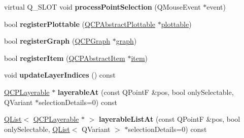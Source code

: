 \begin{DoxyCompactItemize}
\item 
virtual Q\+\_\+\+S\+L\+OT void {\bfseries process\+Point\+Selection} (Q\+Mouse\+Event $\ast$event)\hypertarget{class_q_custom_plot_ac13c10fff6613e3e80e13c787b010838}{}\label{class_q_custom_plot_ac13c10fff6613e3e80e13c787b010838}

\item 
bool {\bfseries register\+Plottable} (\hyperlink{class_q_c_p_abstract_plottable}{Q\+C\+P\+Abstract\+Plottable} $\ast$\hyperlink{class_q_custom_plot_a32de81ff53e263e785b83b52ecd99d6f}{plottable})\hypertarget{class_q_custom_plot_aeba7733bb9fadfb5a375b3f40de9e58a}{}\label{class_q_custom_plot_aeba7733bb9fadfb5a375b3f40de9e58a}

\item 
bool {\bfseries register\+Graph} (\hyperlink{class_q_c_p_graph}{Q\+C\+P\+Graph} $\ast$\hyperlink{class_q_custom_plot_a6d3ed93c2bf46ab7fa670d66be4cddaf}{graph})\hypertarget{class_q_custom_plot_acfc01230bddaea4f1782e4aa7d130af6}{}\label{class_q_custom_plot_acfc01230bddaea4f1782e4aa7d130af6}

\item 
bool {\bfseries register\+Item} (\hyperlink{class_q_c_p_abstract_item}{Q\+C\+P\+Abstract\+Item} $\ast$\hyperlink{class_q_custom_plot_a3e842b5a65b1d17fbb96cfb1fa1314d1}{item})\hypertarget{class_q_custom_plot_afbd4010b2e3f364c8d512691b2a1640a}{}\label{class_q_custom_plot_afbd4010b2e3f364c8d512691b2a1640a}

\item 
void {\bfseries update\+Layer\+Indices} () const \hypertarget{class_q_custom_plot_a3117754df3a5638787a6223c7147970f}{}\label{class_q_custom_plot_a3117754df3a5638787a6223c7147970f}

\item 
\hyperlink{class_q_c_p_layerable}{Q\+C\+P\+Layerable} $\ast$ {\bfseries layerable\+At} (const Q\+PointF \&pos, bool only\+Selectable, Q\+Variant $\ast$selection\+Details=0) const \hypertarget{class_q_custom_plot_a3fffd1d8364f657482ae985e0b5aa028}{}\label{class_q_custom_plot_a3fffd1d8364f657482ae985e0b5aa028}

\item 
\hyperlink{class_q_list}{Q\+List}$<$ \hyperlink{class_q_c_p_layerable}{Q\+C\+P\+Layerable} $\ast$ $>$ {\bfseries layerable\+List\+At} (const Q\+PointF \&pos, bool only\+Selectable, \hyperlink{class_q_list}{Q\+List}$<$ Q\+Variant $>$ $\ast$selection\+Details=0) const \hypertarget{class_q_custom_plot_af80753be504e55fdcc366845c021d7cb}{}\label{class_q_custom_plot_af80753be504e55fdcc366845c021d7cb}


\end{DoxyCompactItemize}
